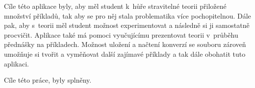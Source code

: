 Cíle této aplikace byly, aby měl student k~hůře stravitelné teorii přiložené množství příkladů, tak aby se pro něj stala problematika více pochopitelnou. Dále pak, aby s~teorii měl student možnost experimentovat a následně si ji samostatně procvičit. Aplikace také má pomoci vyučujícímu prezentovat teorii v~průběhu přednášky na příkladech. Možnost uložení a načtení konverzí se souboru zároveň umožňuje si tvořit a vyměňovat další zajímavé příklady a tak dále obohatit tuto aplikaci. 

Cíle této práce, byly splněny.

